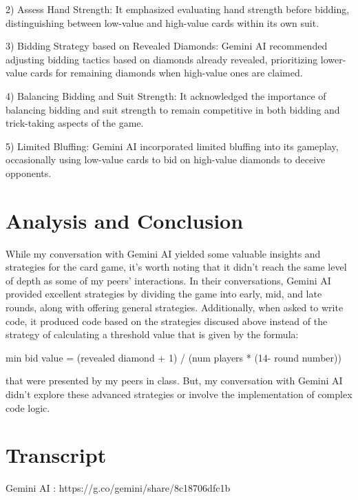 \documentclass[12pt,a4]{article}
\begin{document}
2) Assess Hand Strength: It emphasized evaluating hand strength before bidding, distinguishing between low-value and high-value cards within its own suit.

3) Bidding Strategy based on Revealed Diamonds: Gemini AI recommended adjusting bidding tactics based on diamonds already revealed, prioritizing lower-value cards for remaining diamonds when high-value ones are claimed.

4) Balancing Bidding and Suit Strength: It acknowledged the importance of balancing bidding and suit strength to remain competitive in both bidding and trick-taking aspects of the game.

5) Limited Bluffing: Gemini AI incorporated limited bluffing into its gameplay, occasionally using low-value cards to bid on high-value diamonds to deceive opponents.

\section{Analysis and Conclusion}
While my conversation with Gemini AI yielded some valuable insights and strategies for the card game, it's worth noting that it didn't reach the same level of depth as some of my peers' interactions. In their conversations, Gemini AI provided excellent strategies by dividing the game into early, mid, and late rounds, along with offering general strategies. Additionally, when asked to write code, it produced code based on the strategies discused above instead of the strategy of calculating a threshold value that is given by the formula:

 min bid value = (revealed diamond + 1) / (num players * (14- round number)) 
 
 that were presented by my peers in class. But, my conversation with Gemini AI didn't explore these advanced strategies or involve the implementation of complex code logic.

\section{Transcript}
Gemini AI : https://g.co/gemini/share/8c18706dfc1b 
 
\end{document}
